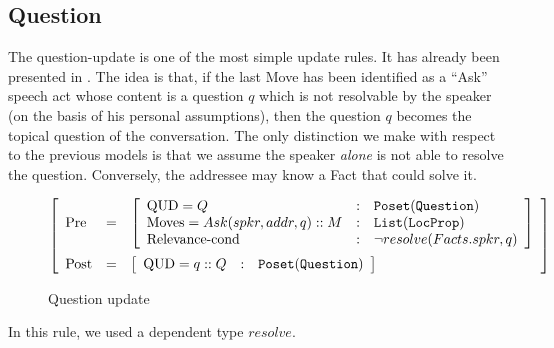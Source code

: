 \documentclass[11pt]{article}
\newenvironment{recenv}
{\left[\begin{array}{lll}}
{\end{array}\right]}
\begin{document}
			\subsection{Question}
				The question-update is one of the most simple update rules. It has already been presented in \cite{ginzburg2012, ginzburg2017}. The idea is that, if the last Move has been identified as a ``Ask'' speech act whose content is a question $q$ which is not resolvable by the speaker (on the basis of his personal assumptions), then the question $q$ becomes the topical question of the conversation. The only distinction we make with respect to the previous models is that we assume the speaker \textit{alone} is not able to resolve the question. Conversely, the addressee may know a Fact that could solve it. 
				\begin{figure*}[h]
					\begin{equation*}
						\begin{recenv}
							\mbox{Pre} &=& \begin{recenv}
								\mbox{QUD} = Q &:& \texttt{Poset}(\texttt{Question})\\
								\mbox{Moves} = Ask(spkr, addr, q) :: M &:& \texttt{List}(\texttt{LocProp})\\
								\mbox{Relevance-cond} &:& \neg resolve(Facts.spkr, q) 
							\end{recenv} \vspace{2mm}\\
							\mbox{Post} &=& \begin{recenv}
								\mbox{QUD} = q :: Q &:& \texttt{Poset}(\texttt{Question})\\ 
							\end{recenv}
						\end{recenv}
					\end{equation*}
					\caption{Question update}
				\end{figure*}
				In this rule, we used a dependent type $resolve$. 
\end{document}
